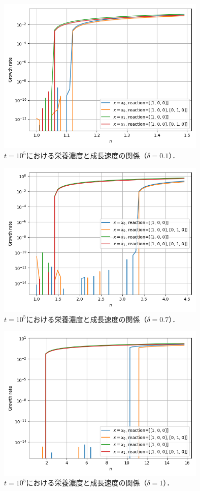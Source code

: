 \documentclass[a4paper,11pt]{jsarticle}
\begin{document}
\begin{figure}[htbp]
  \centering
  \includegraphics[width=10cm]{waste_errslp01_s01_ng_focus.png}
  \caption{$t=10^5$における栄養濃度と成長速度の関係（$\delta=0.1$）．}
  \label{fig:errslp01_ng}
\end{figure}

\begin{figure}[htbp]
  \centering
  \includegraphics[width=10cm]{waste_errslp07_s01_ng_focus.png}
  \caption{$t=10^5$における栄養濃度と成長速度の関係（$\delta=0.7$）．}
  \label{fig:errslp07_ng}
\end{figure}

\begin{figure}[htbp]
  \centering
  \includegraphics[width=10cm]{waste_errslp1_s01_ng_focus.png}
  \caption{$t=10^5$における栄養濃度と成長速度の関係（$\delta=1$）．}
  \label{fig:errslp1_ng}
\end{figure}
\end{document}
